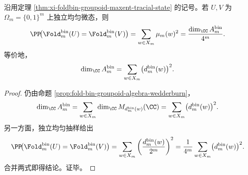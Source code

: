 \begin{theorem}[碰撞概率等于纤维群胚代数的归一化维数]\label{thm:xi-foldbin-collision-probability-normalized-groupoid-dimension}
沿用定理 \ref{thm:xi-foldbin-groupoid-maxent-tracial-state} 的记号。若 \(U,V\) 为 \(\Omega_m=\{0,1\}^m\) 上独立均匀微态，则
\[
\PP\!\bigl(\Fold^{\mathrm{bin}}_m(U)=\Fold^{\mathrm{bin}}_m(V)\bigr)
=
\sum_{w\in X_m}\mu_m(w)^2
=
\frac{\dim_{\CC}A_m^{\mathrm{bin}}}{4^m}.
\]
等价地，
\[
\dim_{\CC}A_m^{\mathrm{bin}}
=
\sum_{w\in X_m}\bigl(d_m^{\mathrm{bin}}(w)\bigr)^2.
\]
\end{theorem}
\begin{proof}
仍由命题 \ref{prop:fold-bin-groupoid-algebra-wedderburn}，
\[
\dim_{\CC}A_m^{\mathrm{bin}}
=
\sum_{w\in X_m}
\dim_{\CC}M_{d_m^{\mathrm{bin}}(w)}(\CC)
=
\sum_{w\in X_m}\bigl(d_m^{\mathrm{bin}}(w)\bigr)^2.
\]
另一方面，独立均匀抽样给出
\[
\PP\!\bigl(\Fold^{\mathrm{bin}}_m(U)=\Fold^{\mathrm{bin}}_m(V)\bigr)
=
\sum_{w\in X_m}
\left(\frac{d_m^{\mathrm{bin}}(w)}{2^m}\right)^2
=
\frac{1}{4^m}
\sum_{w\in X_m}\bigl(d_m^{\mathrm{bin}}(w)\bigr)^2.
\]
合并两式即得结论。证毕。
\end{proof}

